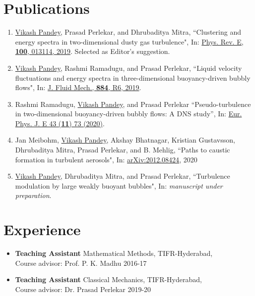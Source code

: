 \documentclass[margin]{res}
\begin{document}
\begin{resume}
    \section{Publications}
\begin{enumerate}
    \item \underline{Vikash Pandey},
        Prasad Perlekar, and Dhrubaditya Mitra, ``Clustering and energy spectra in
        two-dimensional dusty gas turbulence", In:
        \href{https://doi.org/10.1103/PhysRevE.100.013114}{Phys. Rev. E, \textbf{100}, 013114,
        2019}. Selected as Editor's suggestion.
    \item \underline{Vikash Pandey}, Rashmi Ramadugu, and Prasad Perlekar, 
        ``Liquid velocity fluctuations and energy spectra in three-dimensional buoyancy-driven
        bubbly flows", In: \href{https://doi.org/10.1017/jfm.2019.991}{J. Fluid Mech.,
        \textbf{884}, R6, 2019}.
    \item Rashmi  Ramadugu, \underline{Vikash  Pandey}, and Prasad  Perlekar
        ``Pseudo-turbulence in two-dimensional buoyancy-driven bubbly flows: A DNS study'', In: \href{
        DOI: 10.1140/epje/i2020-11997-0} {Eur. Phys. J. E 43 ({\bf 11}) 73 (2020)}.
\item Jan Meibohm, \underline{Vikash Pandey},  Akshay Bhatnagar, Kristian Gustavsson, 
        Dhrubaditya Mitra,  Prasad Perlekar, and B. Mehlig, ``Paths to caustic formation in
        turbulent aerosols", In:
        \href{https://arxiv.org/abs/2012.08424}{arXiv:2012.08424}, 2020
    \item \underline{Vikash Pandey}, Dhrubaditya Mitra, and Prasad Perlekar, ``Turbulence modulation by
        large weakly buoyant bubbles", In: {\it manuscript under
        preparation}.
\end{enumerate}


\section{Experience}
    \begin{itemize}
\item  {\bf Teaching Assistant} Mathematical Methods, TIFR-Hyderabad,\\
    Course advisor: Prof. P. K. Madhu \hfill  2016-17\\
\item  {\bf Teaching Assistant} Classical Mechanics, TIFR-Hyderabad, \\
    Course advisor: Dr. Prasad Perlekar \hfill  2019-20
    \end{itemize}


\end{resume}
\end{document}

